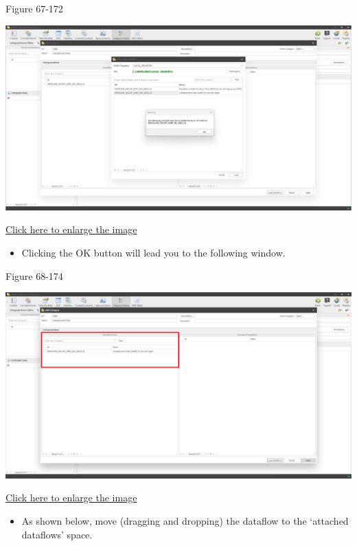 \documentclass[
]{book}
\providecommand{\tightlist}{%
  \setlength{\itemsep}{0pt}\setlength{\parskip}{0pt}}
\theoremstyle{definition}
\theoremstyle{definition}
\theoremstyle{definition}
\theoremstyle{definition}
\theoremstyle{remark}
\begin{document}
Figure 67-172

\begin{center}\includegraphics[width=1\linewidth]{./images/image172} \end{center}

\href{images/image172.png}{Click here to enlarge the image}

\begin{itemize}
\tightlist
\item
  Clicking the OK button will lead you to the following window.
\end{itemize}

Figure 68-174

\begin{center}\includegraphics[width=1\linewidth]{./images/image174} \end{center}

\href{images/image174.png}{Click here to enlarge the image}

\begin{itemize}
\tightlist
\item
  As shown below, move (dragging and dropping) the dataflow to the `attached dataflows' space.
\end{itemize}
\end{document}
